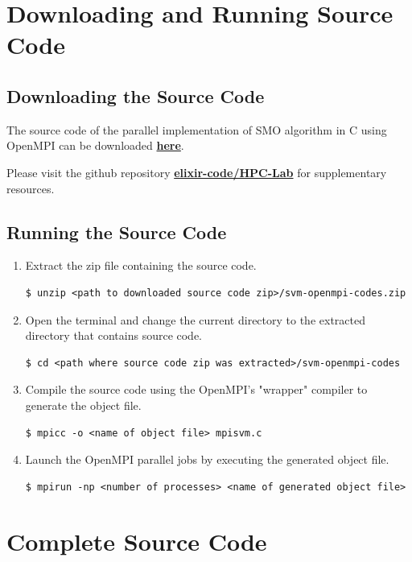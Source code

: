 \documentclass{article}
\begin{document}
\begin{appendices}	
	\section{Downloading and Running Source Code}
		\subsection{Downloading the Source Code}
			The source code of the parallel implementation of SMO algorithm in C using OpenMPI can be downloaded \href{https://github.com/elixir-code/HPC-Lab/raw/master/Project/SVM-OpenMPI/svm-openmpi-codes.zip}{\textbf{here}}.
			
			Please visit the github repository \href{https://github.com/elixir-code/HPC-Lab/}{\textbf{elixir-code/HPC-Lab}} for supplementary resources.
			
			\subsection{Running the Source Code}
				\begin{enumerate}
					\item Extract the zip file containing the source code.				
						\begin{lstlisting}[style=BashStyle]
$ unzip <path to downloaded source code zip>/svm-openmpi-codes.zip
						\end{lstlisting}
						
					\item Open the terminal and change the current directory to the extracted directory that contains source code.
						\begin{lstlisting}[style=BashStyle]
$ cd <path where source code zip was extracted>/svm-openmpi-codes
						\end{lstlisting}
					
					\item Compile the source code using the OpenMPI's "wrapper" compiler to generate the object file.
						\begin{lstlisting}[style=BashStyle]
$ mpicc -o <name of object file> mpisvm.c
						\end{lstlisting}
						
					\item Launch the OpenMPI parallel jobs by executing the generated object file.
						
						\begin{lstlisting}[style=BashStyle]
$ mpirun -np <number of processes> <name of generated object file>
						\end{lstlisting}	
				\end{enumerate}
	\pagebreak
	
	\section{Complete Source Code}
		
		
\end{appendices}		
	
\end{document}
